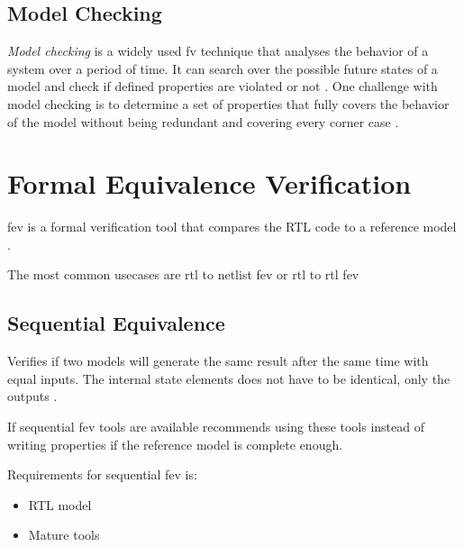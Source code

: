 \subsection{Model Checking}

\textit{Model checking} is a widely used \acrshort{fv} technique that analyses the behavior of a system over a period of time. It can search over the possible future states of a model and check if defined properties are violated or not \cite{seligmanFormalVerificationEssential2015}. One challenge with model checking is to determine a set of properties that fully covers the behavior of the model without being redundant and covering every corner case \cite{castromarquezFormalEquivalenceChecking2013}.

\section{Formal Equivalence Verification}

\acrfull{fev} is a formal verification tool that compares the RTL code to a reference model \cite{seligmanFormalVerificationEssential2015}.

The most common usecases are \acrshort{rtl} to netlist \acrshort{fev} or \acrshort{rtl} to \acrshort{rtl} \acrshort{fev}

\subsection{Sequential Equivalence}

Verifies if two models will generate the same result after the same time with equal inputs. The internal state elements does not have to be identical, only the outputs \cite{seligmanFormalVerificationEssential2015}.

If sequential \acrshort{fev} tools are available \textcite{seligmanFormalVerificationEssential2015} recommends using these tools instead of writing properties if the reference model is complete enough.

Requirements for sequential \acrshort{fev} is:
\begin{itemize}
    \item RTL model
    \item Mature tools
\end{itemize}




